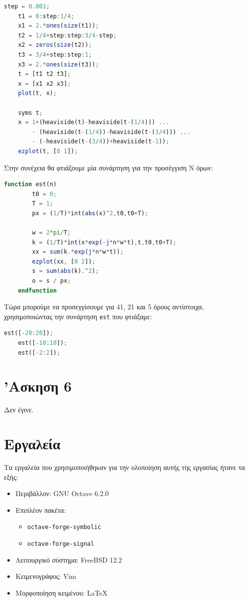 \documentclass{article}
\begin{document}
\begin{lstlisting}[language=octave]
	step = 0.001;
	t1 = 0:step:1/4;
	x1 = 2.*ones(size(t1));
	t2 = 1/4+step:step:3/4-step;
	x2 = zeros(size(t2));
	t3 = 3/4+step:step:1;
	x3 = 2.*ones(size(t3));
	t = [t1 t2 t3];
	x = [x1 x2 x3];
	plot(t, x);

	syms t;
	x = 1+(heaviside(t)-heaviside(t-(1/4))) ...
		- (heaviside(t-(1/4))-heaviside(t-(3/4))) ...
		- (-heaviside(t-(3/4))+heaviside(t-1));
	ezplot(t, [0 1]);

\end{lstlisting}

Στην συνέχεια θα φτιάξουμε μία συνάρτηση για την προσέγγιση Ν όρων:

\begin{lstlisting}[language=octave]
	function est(n)
		t0 = 0;
		T = 1;
		px = (1/T)*int(abs(x)^2,t0,t0+T);

		w = 2*pi/T;
		k = (1/T)*int(x*exp(-j*n*w*t),t,t0,t0+T);
		xx = sum(k.*exp(j*n*w*t));
		ezplot(xx, [0 2]);
		s = sum(abs(k).^2);
		o = s / px;
	endfunction
\end{lstlisting}

Τώρα μπορούμε να προσεγγίσουμε για 41, 21 και 5 όρους αντίστοιχα,
χρησιμοποιώντας την συνάρτηση \lstinline{est} που φτιάξαμε:

\begin{lstlisting}[language=octave]
	est([-20:20]);
	est([-10:10]);
	est([-2:2]);
\end{lstlisting}

\section{'Ασκηση 6}

Δεν έγινε.

\pagebreak
\section{Εργαλεία}
Τα εργαλεία που χρησιμοποιήθηκαν για την υλοποίηση αυτής της εργασίας ήτανε
τα εξής:
\begin{itemize}
        \item Περιβάλλον: GNU Octave 6.2.0
        \item Επιπλέον πακέτα:
        \begin{itemize}
                \item \lstinline{octave-forge-symbolic}
                \item \lstinline{octave-forge-signal}
        \end{itemize}
        \item Λειτουργικό σύστημα: FreeBSD 12.2
        \item Κειμενογράφος: Vim
        \item Μορφοποίηση κειμένου: \LaTeX
\end{itemize}
\end{document}
